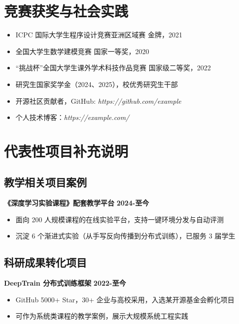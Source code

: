 \section{\makebox[\widthof{\faTrophy}][c]{\color{USTB_Blue}{\faTrophy}}\quad 竞赛获奖与社会实践}
\vspace{0.3em}
\begin{itemize}
  \item ICPC 国际大学生程序设计竞赛亚洲区域赛 金牌，2021
  \item 全国大学生数学建模竞赛 国家一等奖，2020
  \item “挑战杯”全国大学生课外学术科技作品竞赛 国家级二等奖，2022
  \item 研究生国家奖学金（2024、2025），校优秀研究生干部
  \item 开源社区贡献者，GitHub: \textit{https://github.com/example}
  \item 个人技术博客：\textit{https://example.com/}
\end{itemize}

\section{\makebox[\widthof{\faLightbulb}][c]{\color{USTB_Blue}{\faLightbulb}}\quad 代表性项目补充说明}
\vspace{0.3em}
\subsection{教学相关项目案例}
{\large{\textbf{《深度学习实验课程》配套教学平台}}} \hfill \textbf{2024-至今}
\begin{itemize}
    \item 面向 200 人规模课程的在线实验平台，支持一键环境分发与自动评测
    \item 沉淀 6 个渐进式实验（从手写反向传播到分布式训练），已服务 3 届学生
\end{itemize}

\subsection{科研成果转化项目}
{\large{\textbf{DeepTrain 分布式训练框架}}} \hfill \textbf{2022-至今}
\begin{itemize}
    \item GitHub 5000+ Star，30+ 企业与高校采用，入选某开源基金会孵化项目
    \item 可作为系统类课程的教学案例，展示大规模系统工程实践
\end{itemize}

